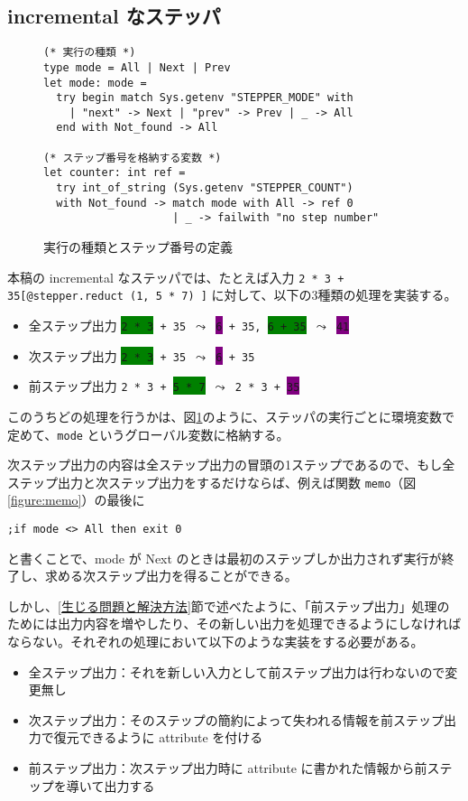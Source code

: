 \subsection{incremental なステッパ}

\begin{figure}[t]
\begin{verbatim}
(* 実行の種類 *)
type mode = All | Next | Prev
let mode: mode =
  try begin match Sys.getenv "STEPPER_MODE" with
    | "next" -> Next | "prev" -> Prev | _ -> All
  end with Not_found -> All

(* ステップ番号を格納する変数 *)
let counter: int ref =
  try int_of_string (Sys.getenv "STEPPER_COUNT")
  with Not_found -> match mode with All -> ref 0
                    | _ -> failwith "no step number"
\end{verbatim}
\caption{実行の種類とステップ番号の定義}
\label{figure:mode}
\end{figure}

本稿の incremental なステッパでは、たとえば入力 \texttt{2 * 3 + 35[@stepper.reduct (1, 5 * 7) ]} に対して、以下の3種類の処理を実装する。

\begin{itemize}
\item 全ステップ出力 \texttt{\colorbox{green}{2 * 3} + 35 $\leadsto$ \colorbox{purple}{6} + 35, \colorbox{green}{6 + 35} $\leadsto$ \colorbox{purple}{41}}
\item 次ステップ出力 \texttt{\colorbox{green}{2 * 3} + 35 $\leadsto$ \colorbox{purple}{6} + 35}
\item 前ステップ出力 \texttt{2 * 3 + \colorbox{green}{5 * 7} $\leadsto$ 2 * 3 + \colorbox{purple}{35}}
\end{itemize}

このうちどの処理を行うかは、図\ref{figure:mode}のように、ステッパの実行ごとに環境変数で定めて、\texttt{mode} というグローバル変数に格納する。

次ステップ出力の内容は全ステップ出力の冒頭の1ステップであるので、もし全ステップ出力と次ステップ出力をするだけならば、例えば関数 \texttt{memo}（図\ref{figure:memo}）の最後に
\begin{verbatim}
;if mode <> All then exit 0
\end{verbatim}
と書くことで、mode が Next のときは最初のステップしか出力されず実行が終了し、求める次ステップ出力を得ることができる。

しかし、\ref{生じる問題と解決方法}節で述べたように、「前ステップ出力」処理のためには出力内容を増やしたり、その新しい出力を処理できるようにしなければならない。それぞれの処理において以下のような実装をする必要がある。
\begin{itemize}
\item 全ステップ出力：それを新しい入力として前ステップ出力は行わないので変更無し
\item 次ステップ出力：そのステップの簡約によって失われる情報を前ステップ出力で復元できるように attribute を付ける
\item 前ステップ出力：次ステップ出力時に attribute に書かれた情報から前ステップを導いて出力する
\end{itemize}

